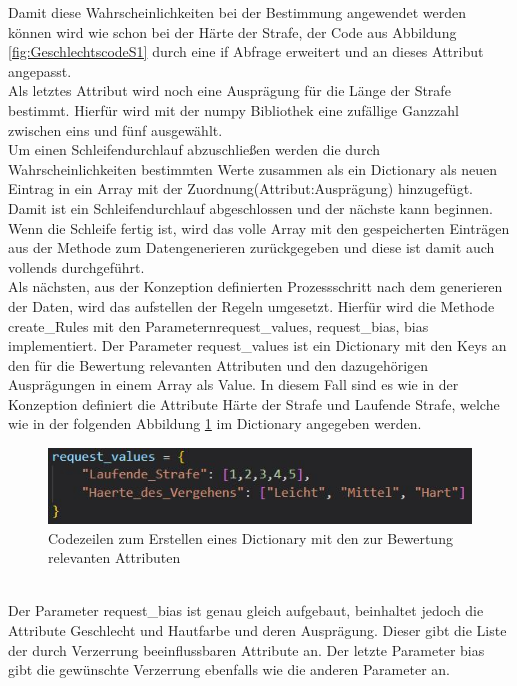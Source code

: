 \begin{onehalfspace}
Damit diese Wahrscheinlichkeiten bei der Bestimmung angewendet werden können wird wie schon bei der Härte der Strafe, der Code aus Abbildung \ref{fig:GeschlechtscodeS1} durch eine if Abfrage erweitert und an dieses Attribut angepasst.\\
Als letztes Attribut wird noch eine Ausprägung für die Länge der Strafe bestimmt. Hierfür wird mit der \glqq{}numpy\grqq{} Bibliothek eine zufällige Ganzzahl zwischen eins und fünf ausgewählt.\\
Um einen Schleifendurchlauf abzuschließen werden die durch Wahrscheinlichkeiten bestimmten Werte zusammen als ein Dictionary als neuen Eintrag in ein Array mit der Zuordnung(Attribut:Ausprägung) hinzugefügt. Damit ist ein Schleifendurchlauf abgeschlossen und der nächste kann beginnen. Wenn die Schleife fertig ist, wird das volle Array mit den gespeicherten Einträgen aus der Methode zum Datengenerieren zurückgegeben und diese ist damit auch vollends durchgeführt.\\
Als nächsten, aus der Konzeption definierten Prozessschritt nach dem generieren der Daten, wird das aufstellen der Regeln umgesetzt. Hierfür wird die Methode \glqq{}create\_Rules\grqq{} mit den Parametern\glqq{}request\_values, request\_bias, bias\grqq{} implementiert. Der Parameter \glqq{}request\_values\grqq{} ist ein Dictionary mit den Keys an den für die Bewertung relevanten Attributen und den dazugehörigen Ausprägungen in einem Array als Value. In diesem Fall sind es wie in der Konzeption definiert die Attribute Härte der Strafe und Laufende Strafe, welche wie in der folgenden Abbildung \ref{fig:RequestValues} im Dictionary angegeben werden.\\
\begin{figure}[h]
    \centering
    \includegraphics{Diagramme/Sz1_RequestValues.JPG}
    \caption{Codezeilen zum Erstellen eines Dictionary mit den zur Bewertung relevanten Attributen}
    \label{fig:RequestValues}
\end{figure}\\
Der Parameter \glqq{}request\_bias\grqq{} ist genau gleich aufgebaut, beinhaltet jedoch die Attribute Geschlecht und Hautfarbe und deren Ausprägung. Dieser gibt die Liste der durch Verzerrung beeinflussbaren Attribute an. Der letzte Parameter \glqq{}bias\grqq{} gibt die gewünschte Verzerrung ebenfalls wie die anderen Parameter an. 

\end{onehalfspace}
